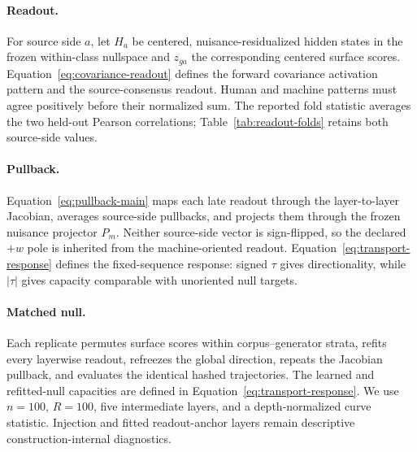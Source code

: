 \paragraph{Readout.} For source side \(a\), let \(H_a\) be centered, nuisance-residualized hidden states in the frozen within-class nullspace and \(z_{ga}\) the corresponding centered surface scores. Equation~\ref{eq:covariance-readout} defines the forward covariance activation pattern and the source-consensus readout. Human and machine patterns must agree positively before their normalized sum. The reported fold statistic averages the two held-out Pearson correlations; Table~\ref{tab:readout-folds} retains both source-side values.




\paragraph{Pullback.} Equation~\ref{eq:pullback-main} maps each late readout through the layer-to-layer Jacobian, averages source-side pullbacks, and projects them through the frozen nuisance projector \(P_m\). Neither source-side vector is sign-flipped, so the declared \(+w\) pole is inherited from the machine-oriented readout. Equation~\ref{eq:transport-response} defines the fixed-sequence response: signed \(\tau\) gives directionality, while \(|\tau|\) gives capacity comparable with unoriented null targets.

\paragraph{Matched null.} Each replicate permutes surface scores within corpus--generator strata, refits every layerwise readout, refreezes the global direction, repeats the Jacobian pullback, and evaluates the identical hashed trajectories. The learned and refitted-null capacities are defined in Equation~\ref{eq:transport-response}. We use \(n=100\), \(R=100\), five intermediate layers, and a depth-normalized curve statistic. Injection and fitted readout-anchor layers remain descriptive construction-internal diagnostics.

